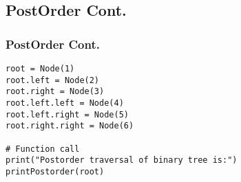 \documentclass{beamer}
\begin{document}
\begin{frame}[fragile]
\subsection{PostOrder Cont.}
\frametitle{PostOrder Cont.}
\begin{lstlisting}
root = Node(1)
root.left = Node(2)
root.right = Node(3)
root.left.left = Node(4)
root.left.right = Node(5)
root.right.right = Node(6)

# Function call
print("Postorder traversal of binary tree is:")
printPostorder(root)
\end{lstlisting}
\end{frame}
\end{document}
